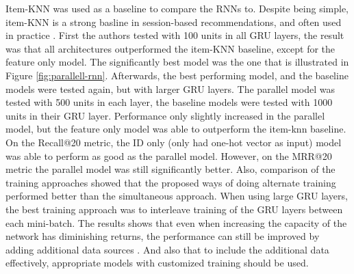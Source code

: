 Item-KNN was used as a baseline to compare the RNNs to. Despite being simple, item-KNN is a strong basline in session-based recommendations, and often used in practice \cite{Hidasi:2016:PRN:2959100.2959167}. First the authors tested with 100 units in all GRU layers, the result was that all architectures outperformed the item-KNN baseline, except for the feature only model. The significantly best model was the one that is illustrated in Figure \ref{fig:parallell-rnn}. Afterwards, the best performing model, and the baseline models were tested again, but with larger GRU layers. The parallel model was tested with 500 units in each layer, the baseline models were tested with 1000 units in their GRU layer. Performance only slightly increased in the parallel model, but the feature only model was able to outperform the item-knn baseline. On the Recall@20 metric, the ID only (only had one-hot vector as input) model was able to perform as good as the parallel model. However, on the MRR@20 metric the parallel model was still significantly better. Also, comparison of the training approaches showed that the proposed ways of doing alternate training performed better than the simultaneous approach. When using large GRU layers, the best training approach was to interleave training of the GRU layers between each mini-batch. The results shows that even when increasing the capacity of the network has diminishing returns, the performance can still be improved by adding additional data sources \cite{Hidasi:2016:PRN:2959100.2959167}. And also that to include the additional data effectively, appropriate models with customized training should be used.





